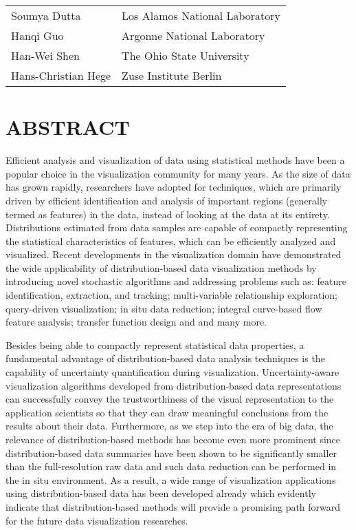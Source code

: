 \documentclass[preprint,journal]{vgtc}       %
\begin{document}
\vspace{-0.1in}
\begin{table}[H]
\begin{tabular}{ll}
Soumya Dutta & Los Alamos National Laboratory\\
Hanqi Guo & Argonne National Laboratory\\
Han-Wei Shen & The Ohio State University\\
Hans-Christian Hege & Zuse Institute Berlin\\
\end{tabular}
\end{table}

\section*{ABSTRACT}
Efficient analysis and visualization of data using statistical methods have been a popular choice in the visualization community for many years. As the size of data has grown rapidly, researchers have adopted for techniques, which are primarily driven by efficient identification and analysis of important regions (generally termed as features) in the data, instead of looking at the data at its entirety. Distributions estimated from data samples are capable of compactly representing the statistical characteristics of features, which can be efficiently analyzed and visualized. Recent developments in the visualization domain have demonstrated the wide  applicability of distribution-based data visualization methods by introducing novel stochastic algorithms and addressing problems such as: feature identification, extraction, and tracking; multi-variable relationship exploration; query-driven visualization; in situ data reduction; integral curve-based flow feature analysis; transfer function design and and many more.

Besides being able to compactly represent statistical data properties, a fundamental advantage of distribution-based data analysis techniques is the capability of uncertainty quantification during visualization. Uncertainty-aware visualization algorithms developed from distribution-based data representations can successfully convey the trustworthiness of the visual representation to the application scientists so that they can draw meaningful conclusions from the results about their data. Furthermore, as we step into the era of big data, the relevance of distribution-based methods has become even more prominent since distribution-based data summaries have been shown to be significantly smaller than the full-resolution raw data and such data reduction can be performed in the in situ environment. As a result, a wide range of visualization applications using distribution-based data has been developed already which evidently indicate that distribution-based methods will provide a promising path forward for the future data visualization researches.
\end{document}
